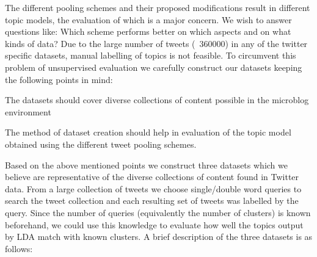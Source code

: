 \documentclass[10pt,a5paper,twoside]{article}
\begin{document}
The different pooling schemes and their proposed modifications result in different topic models, the evaluation of which is a major concern. We wish to answer questions like: Which scheme performs better on which aspects and on what kinds of data? Due to the large number of tweets (~360000) in any of the twitter specific datasets, manual labelling of topics is not feasible. To circumvent this problem of unsupervised evaluation we carefully construct our datasets keeping the following points in mind:
\begin{compactitem}
\item The datasets should cover diverse collections of content possible in the microblog environment
\item The method of dataset creation should help in evaluation of the topic model obtained using the different tweet pooling schemes.
\end{compactitem}

Based on the above mentioned points we construct three datasets which we believe are representative of the diverse collections of content found in Twitter data. From a large collection of tweets we choose single/double word queries to search the tweet collection and each resulting set of tweets was labelled by the query. Since the number of queries (equivalently the number of clusters) is known beforehand, we could use this knowledge to evaluate how well the topics output by LDA match with known clusters. A brief description of the three datasets is as follows:
\end{document}
